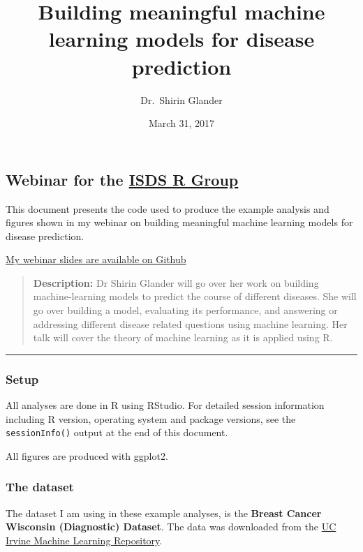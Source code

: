 \documentclass[]{article}
\title{Building meaningful machine learning models for disease prediction}
\author{Dr.~Shirin Glander}
\date{March 31, 2017}
\begin{document}
\maketitle

\subsection{\texorpdfstring{Webinar for the
\href{http://www.syndromic.org/cop/r}{ISDS R
Group}}{Webinar for the ISDS R Group}}\label{webinar-for-the-isds-r-group}

This document presents the code used to produce the example analysis and
figures shown in my webinar on building meaningful machine learning
models for disease prediction.

\href{https://github.com/ShirinG/Webinar_ISDS/blob/master/Webinar_slides.pdf}{My
webinar slides are available on Github}

\begin{quote}
\textbf{Description:} Dr Shirin Glander will go over her work on
building machine-learning models to predict the course of different
diseases. She will go over building a model, evaluating its performance,
and answering or addressing different disease related questions using
machine learning. Her talk will cover the theory of machine learning as
it is applied using R.
\end{quote}

\begin{center}\rule{0.5\linewidth}{\linethickness}\end{center}

\subsubsection{Setup}\label{setup}

All analyses are done in R using RStudio. For detailed session
information including R version, operating system and package versions,
see the \texttt{sessionInfo()} output at the end of this document.

All figures are produced with ggplot2.

\subsubsection{The dataset}\label{the-dataset}

The dataset I am using in these example analyses, is the \textbf{Breast
Cancer Wisconsin (Diagnostic) Dataset}. The data was downloaded from the
\href{http://archive.ics.uci.edu/ml/datasets/Breast+Cancer+Wisconsin+\%28Diagnostic\%29}{UC
Irvine Machine Learning Repository}.
\end{document}
